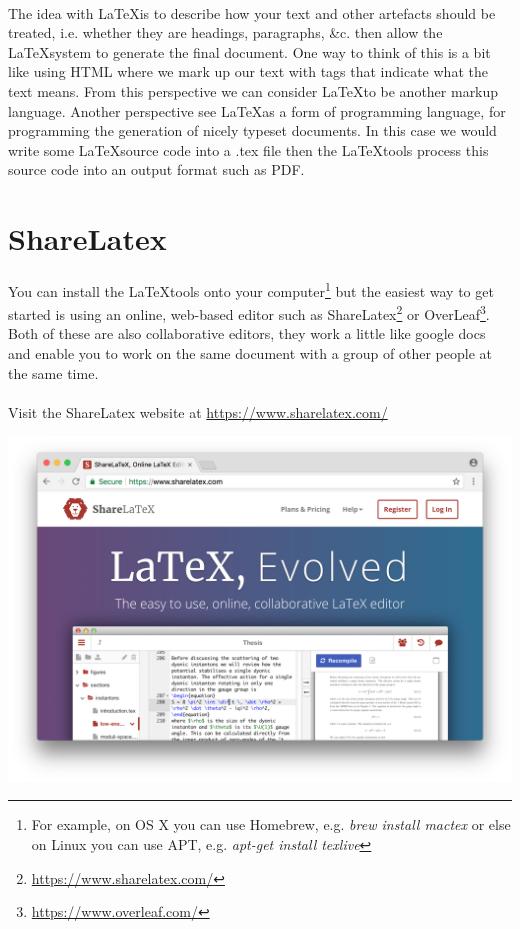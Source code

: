 \documentclass[10pt, a4paper, twosize]{article}
\begin{document}
\paragraph{} The idea with \LaTeX is to describe how your text and other artefacts should be treated, i.e. whether they are headings, paragraphs, \&c. then allow the \LaTeX system to generate the final document. One way to think of this is a bit like using HTML where we mark up our text with tags that indicate what the text means. From this perspective we can consider \LaTeX to be another markup language. Another perspective see \LaTeX as a form of programming language, for programming the generation of nicely typeset documents. In this case we would write some \LaTeX source code into a .tex file then the \LaTeX tools process this source code into an output format such as PDF.

\section{ShareLatex}
\paragraph{} You can install the \LaTeX tools onto your computer\footnote{For example, on OS X you can use Homebrew, e.g. \emph{brew install mactex} or else on Linux you can use APT, e.g. \emph{apt-get install texlive}} but the easiest way to get started is using an online, web-based editor such as ShareLatex\footnote{\url{https://www.sharelatex.com/}} or OverLeaf\footnote{\url{https://www.overleaf.com/}}. Both of these are also collaborative editors, they work a little like google docs and enable you to work on the same document with a group of other people at the same time.

\paragraph{} Visit the ShareLatex website at \url{https://www.sharelatex.com/} 

\includegraphics[width=.8\textwidth]{images/latex_sharelatex}
\end{document}
